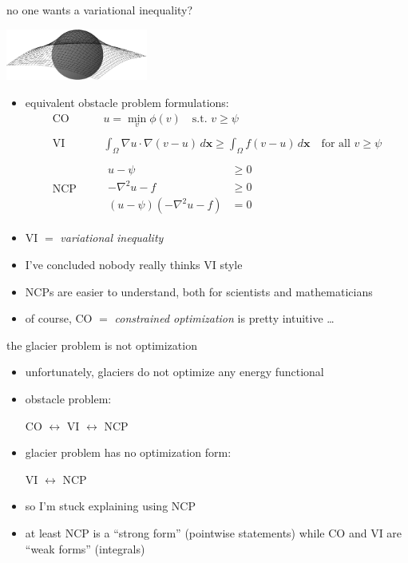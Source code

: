 \documentclass[10pt,hyperref,dvipsnames]{beamer}
\newcommand{\bx}{\mathbf{x}}
\newcommand{\grad}{\nabla}
\begin{document}
\begin{frame}{no one wants a variational inequality?}

\hfill \includegraphics[width=0.35\textwidth]{figs/obstacle65.pdf}

\vspace{-15mm}
\begin{itemize}
\item equivalent obstacle problem formulations:
\begin{align*}
    \text{CO}& &&u = \min_{v} \phi(v) \quad \text{s.t. } v \ge \psi \\
    & \\
    \text{VI}& &&\int_\Omega \grad u \cdot \grad(v-u)\,d\bx \ge \int_\Omega f(v-u)\,d\bx \quad \text{for all } v \ge \psi \\
    & \\
   \text{NCP}& &&\begin{aligned} u - \psi &\ge 0 \\
                                 -\grad^2 u - f &\ge 0 \\
                                 (u - \psi) ( -\grad^2 u - f) &= 0 \end{aligned}
\end{align*}
\item VI $=$ \emph{variational inequality}
\item I've concluded nobody really thinks VI style
\item NCPs are easier to understand, both for scientists and mathematicians
\item of course, CO $=$ \emph{constrained optimization} is pretty intuitive \dots
\end{itemize}
\end{frame}


\begin{frame}{the glacier problem is not optimization}

\begin{itemize}
\item unfortunately, glaciers do not optimize any energy functional

\medskip
\item obstacle problem:

\medskip
\hspace{20mm} CO $\leftrightarrow$ VI $\leftrightarrow$ NCP

\smallskip
\item glacier problem has no optimization form:

\smallskip
\hspace{20mm} \phantom{CO $\leftrightarrow$} VI $\leftrightarrow$ NCP

\medskip
\item so I'm stuck explaining using NCP
\item at least NCP is a ``strong form'' (pointwise statements) while CO and VI are ``weak forms'' (integrals)
\end{itemize}
\end{frame}
\end{document}
